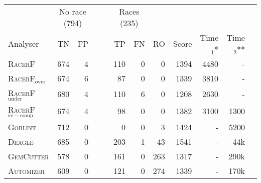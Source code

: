 \begin{tabular}{@{}lrrcrrrrrrr@{}}
\toprule
& \multicolumn{2}{c}{No race (794)} & & \multicolumn{2}{c}{Races (235)}\\

\cmidrule{2-3} \cmidrule{5-6}
Analyser$\hspace{30pt}$ & $\;$TN$\;$ & $\;$FP$\;$ & $\;\;\;\;$ & $\;$TP$\;$ & $\;\;\;\;$FN$\;$ &\;\;\;\;RO &\;\;\;Score\;\; &\;Time$_1$*\;& \;\;\;Time$_2$**\;\\
\midrule
\rowcolor{GreenYellow}


\textsc{RacerF} & 674 & 4 & & 110 & 0 & 0 & 1394 & 4480 & -\\
\textsc{RacerF}$_\mathrm{over}$ & 674 & 6 & & 87 & 0 & 0 & 1339 & 3810 & -\\
\rowcolor[gray]{0.9}
\textsc{RacerF}$_\mathrm{under}$ & 680 & 4 & & 110 & 6 & 0 & 1208 & 2630 & -\\
\midrule
\textsc{RacerF}$_\mathrm{sv-comp}$ & 674 & 4 & & 98 & 0 & 0 & 1382 & 3100 & 1300\\
\rowcolor[gray]{0.9}
\textsc{Goblint} & 712 & 0 & & 0 & 0 & 3 & 1424 & - & 5200\\
\textsc{Deagle} & 685 & 0 & & 203 & 1 & 43 & 1541 & - & 44k\\
\rowcolor[gray]{0.9}
\textsc{GemCutter} & 578 & 0 & & 161 & 0 & 263 & 1317 & - & 290k\\
\textsc{Automizer} & 609 & 0 & & 121 & 0 & 274 & 1339 & - & 170k\\
\bottomrule
\end{tabular}
